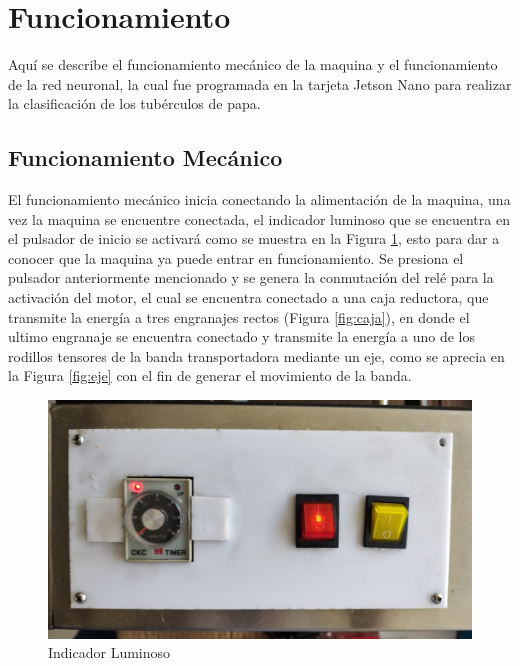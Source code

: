 	\section{Funcionamiento}
	Aquí se describe el funcionamiento mecánico de la maquina y el funcionamiento de la red neuronal, la cual fue programada en la tarjeta Jetson Nano para realizar la clasificación de los tubérculos de papa.
	
	\subsection{Funcionamiento Mecánico}
		El funcionamiento mecánico inicia conectando la alimentación de la maquina, una vez la maquina se encuentre conectada, el indicador luminoso que se encuentra en el pulsador de inicio se activará como se muestra en la Figura \ref{fig:indicador}, esto para dar a conocer que la maquina ya puede entrar en funcionamiento. Se presiona el pulsador anteriormente mencionado y se genera la conmutación del relé para la activación del motor, el cual se encuentra conectado a una caja reductora, que transmite la energía a tres engranajes rectos (Figura \ref{fig:caja}), en donde el ultimo engranaje se encuentra conectado y transmite la energía a uno de los rodillos tensores de la banda transportadora mediante un eje, como se aprecia en la Figura \ref{fig:eje} con el fin de generar el movimiento de la banda. 
		
\newpage

		\begin{figure}[ht]
			\centering
			\includegraphics[angle=270, scale=0.21]{Figs/200.jpg}
			\caption{Indicador Luminoso}
			\label{fig:indicador}
		\end{figure}
			
